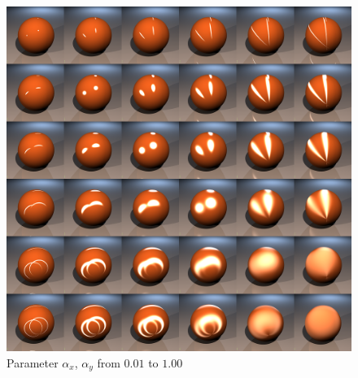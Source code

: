 \documentclass[11pt]{beamer}
\begin{document}
\begin{frame}[allowframebreaks]
\begin{figure}[H]
\includegraphics[height=0.8\textheight]{../warduvcomplete.png}
\caption{Parameter $\alpha_x$, $\alpha_y$ from $0.01$ to $1.00$}
\end{figure}

\end{frame}
\end{document}
